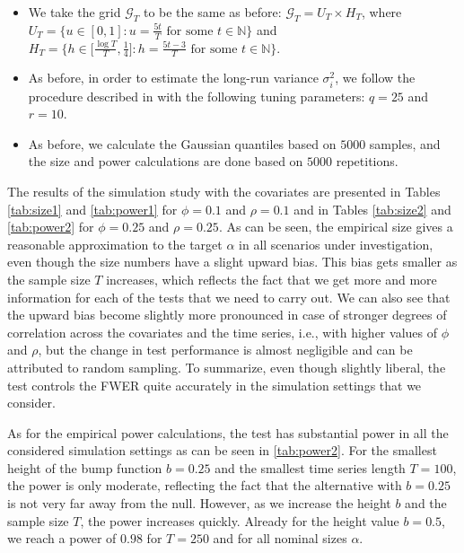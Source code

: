\documentclass[a4paper,12pt]{article}
\begin{document}
\begin{enumerate}[label=\arabic*.,leftmargin=0.6cm]
{\begin{itemize}[topsep=0pt]
\begin{itemize}[label=--,leftmargin=0.45cm,itemsep=0pt]
\item We take the grid $\mathcal{G}_T$ to be the same as before: $\mathcal{G}_T = U_T \times H_T$, where $U_T = \big\{ u \in [0,1]: u = \textstyle{\frac{5t}{T}} \text{ for some } t \in \mathbb{N} \big\}$ and $H_T = \big\{ h \in \big[ \textstyle{\frac{\log T}{T}}, \textstyle{\frac{1}{4}} \big]:  h = \textstyle{\frac{5t - 3}{T}} \text{ for some } t \in \mathbb{N} \big\}$.

\item As before, in order to estimate the long-run variance $\sigma_i^2$, we follow the procedure described in \citet{KhismatullinaVogt2020} with the following tuning parameters: $q = 25$ and $r = 10$.

\item As before, we calculate the Gaussian quantiles based on $5000$ samples, and the size and power calculations are done based on $5000$ repetitions.

\end{itemize}

The results of the simulation study with the covariates are presented in Tables \ref{tab:size1} and \ref{tab:power1} for $\phi = 0.1$ and $\rho = 0.1$ and in Tables \ref{tab:size2} and \ref{tab:power2} for $\phi = 0.25$ and $\rho = 0.25$. As can be seen, the empirical size gives a reasonable approximation to the target $\alpha$ in all scenarios under investigation, even though the size numbers have a slight upward bias. This bias gets smaller as the sample size $T$ increases, which reflects the fact that we get more and more information for each of the tests that we need to carry out. We can also see that the upward bias become slightly more pronounced in case of stronger degrees of correlation across the covariates and the time series, i.e., with higher values of $\phi$ and $\rho$, but the change in test performance is almost negligible and can be attributed to random sampling. To summarize, even though slightly liberal, the test controls the FWER quite accurately in the simulation settings that we consider.

As for the empirical power calculations, the test has substantial power in all the considered simulation settings as can be seen in \ref{tab:power2}. For the smallest height of the bump function $b = 0.25$ and the smallest time series length $T = 100$, the power is only moderate, reflecting the fact that the alternative with $b = 0.25$ is not very far away from the null. However, as we increase the height $b$ and the sample size $T$, the power increases quickly. Already for the height value $b = 0.5$, we reach a power of $0.98$ for $T = 250$ and for all nominal sizes $\alpha$.
 

\end{itemize}}
\end{enumerate}
\end{document}
